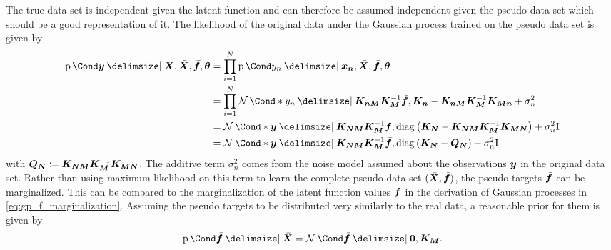 The true data set is independent given the latent function and can therefore be assumed independent given the pseudo data set which should be a good representation of it.
The likelihood of the original data under the Gaussian process trained on the pseudo data set is given by
\begin{align}
    \Prob{\mat{y} \given \mat{X}, \ps{\mat{X}}, \ps{\mat{f}}, \mat{\theta}} &= \prod_{i=1}^N \Prob{y_n \given \mat{x_n}, \ps{\mat{X}}, \ps{\mat{f}}, \mat{\theta}} \\
    &= \prod_{i=1}^N \Gaussian*{y_n \given \mat{K_{n M}}\mat{K_M}^{-1} \ps{\mat{f}}, \mat{K_n} - \mat{K_{n M}} \mat{K_M}^{-1} \mat{K_{M n}} + \sigma_n^2} \\
    &= \Gaussian*{\mat{y} \given \mat{K_{N M}}\mat{K_M}^{-1} \ps{\mat{f}}, \diag\left( \mat{K_N} - \mat{K_{N M}} \mat{K_M}^{-1} \mat{K_{M N}} \right) + \sigma_n^2 \Eye} \\
    &= \Gaussian*{\mat{y} \given \mat{K_{N M}}\mat{K_M}^{-1} \ps{\mat{f}}, \diag\left( \mat{K_N} - \mat{Q_N} \right) + \sigma_n^2 \Eye}
\end{align}
with $\bm{Q_N} \coloneqq \bm{K_{N M}} \bm{K_M}^{-1} \bm{K_{M N}}$.
The additive term $\sigma_n^2$ comes from the noise model assumed about the observations $\bm{y}$ in the original data set.
Rather than using maximum likelihood on this term to learn the complete pseudo data set $(\bar{\bm{X}}, \bar{\bm{f}})$, the pseudo targets $\bar{\bm{f}}$ can be marginalized.
This can be combared to the marginalization of the latent function values $\bm{f}$ in the derivation of Gaussian processes in \cref{eq:gp_f_marginalization}.
Assuming the pseudo targets to be distributed very similarly to the real data, a reasonable prior for them is given by
\begin{align}
    \Prob{\ps{\mat{f}} \given \ps{\mat{X}}} = \Gaussian{\ps{\mat{f}} \given \mat{0}, \mat{K_M}}.
\end{align}

